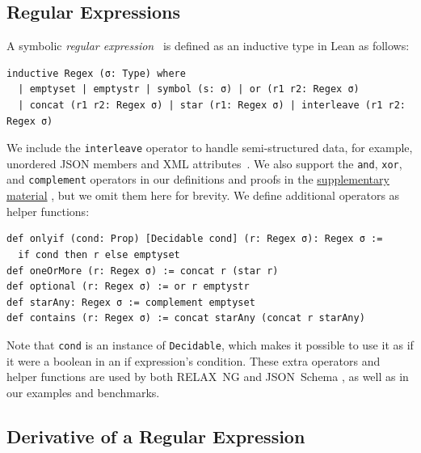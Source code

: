 \documentclass[acmsmall,%
  screen,%
  authorversion, %
  nonacm%
]{acmart}
\newcommand{\RelaxNG}{%
  RELAX~NG\xspace%
}
\newcommand{\JSONSchema}{%
  JSON~Schema\xspace%
}
\newcommand{\supplementarymaterial}{%
  \hyperref[supplementary_material]{supplementary material}\xspace%
}
\newcommand{\JSON}{\ac{JSON}\xspace}
\newcommand{\XML}{\ac{XML}\xspace}
\begin{document}
\subsection{Regular Expressions}
A symbolic \emph{regular expression}~\cite{brzozowski1964derivatives, stanford2021symbolic, elliott2021symbolic} is defined as an inductive type in Lean as follows:
\begin{lstlisting}[label=Regex]
inductive Regex (σ: Type) where
  | emptyset | emptystr | symbol (s: σ) | or (r1 r2: Regex σ)
  | concat (r1 r2: Regex σ) | star (r1: Regex σ) | interleave (r1 r2: Regex σ)
\end{lstlisting}
We include the \lstinline{interleave} operator to handle semi-structured data, for example, unordered \JSON members and \XML attributes~\cite{hosoya2010foundations}.
We also support the \lstinline{and}, \lstinline{xor}, and \lstinline{complement} operators in our definitions and proofs in the \supplementarymaterial, but we omit them here for brevity.
We define additional operators as helper functions:
\begin{lstlisting}
def onlyif (cond: Prop) [Decidable cond] (r: Regex σ): Regex σ :=
  if cond then r else emptyset
def oneOrMore (r: Regex σ) := concat r (star r)
def optional (r: Regex σ) := or r emptystr
def starAny: Regex σ := complement emptyset
def contains (r: Regex σ) := concat starAny (concat r starAny)
\end{lstlisting}
Note that \lstinline{cond} is an instance of \lstinline{Decidable}, which makes it possible to use it as if it were a boolean in an if expression's condition.
These extra operators and helper functions are used by both \RelaxNG and \JSONSchema, as well as in our examples and benchmarks.

\subsection{Derivative of a Regular Expression}
\end{document}
